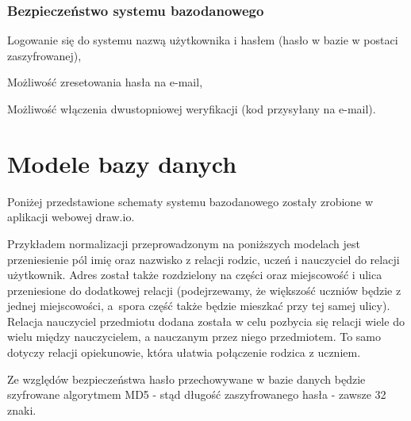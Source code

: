 \documentclass[12pt]{article}
\begin{document}
\subsubsection{Bezpieczeństwo systemu bazodanowego}
\begin{itemize*}
    \item Logowanie się do systemu nazwą użytkownika i hasłem (hasło w bazie w postaci zaszyfrowanej),
    \item Możliwość zresetowania hasła na e-mail,
    \item Możliwość włączenia dwustopniowej weryfikacji (kod przysyłany na e-mail).
\end{itemize*}

\section{Modele bazy danych}

\hspace{0.5cm} Poniżej przedstawione schematy systemu bazodanowego zostały zrobione w aplikacji webowej draw.io.

Przykładem normalizacji przeprowadzonym na poniższych modelach jest przeniesienie pól imię oraz nazwisko z relacji rodzic, uczeń i nauczyciel do relacji użytkownik. Adres został także rozdzielony na części oraz miejscowość i ulica przeniesione do dodatkowej relacji (podejrzewamy, że większość uczniów będzie z jednej miejscowości, a~spora część także będzie mieszkać przy tej samej ulicy). Relacja nauczyciel przedmiotu dodana została w celu pozbycia się relacji wiele do wielu między nauczycielem, a nauczanym przez niego przedmiotem. To samo dotyczy relacji opiekunowie, która ułatwia połączenie rodzica z uczniem.

Ze względów bezpieczeństwa hasło przechowywane w bazie danych będzie szyfrowane algorytmem MD5 - stąd długość zaszyfrowanego hasła - zawsze 32 znaki.
\end{document}
